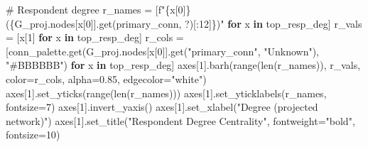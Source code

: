 \documentclass[
  letterpaper,
  DIV=11,
  numbers=noendperiod]{scrartcl}
\newenvironment{Shaded}{\begin{snugshade}}{\end{snugshade}}
\newcommand{\BuiltInTok}[1]{\textcolor[rgb]{0.00,0.23,0.31}{#1}}
\newcommand{\CommentTok}[1]{\textcolor[rgb]{0.37,0.37,0.37}{#1}}
\newcommand{\ControlFlowTok}[1]{\textcolor[rgb]{0.00,0.23,0.31}{\textbf{#1}}}
\newcommand{\DecValTok}[1]{\textcolor[rgb]{0.68,0.00,0.00}{#1}}
\newcommand{\FloatTok}[1]{\textcolor[rgb]{0.68,0.00,0.00}{#1}}
\newcommand{\KeywordTok}[1]{\textcolor[rgb]{0.00,0.23,0.31}{\textbf{#1}}}
\newcommand{\NormalTok}[1]{\textcolor[rgb]{0.00,0.23,0.31}{#1}}
\newcommand{\OperatorTok}[1]{\textcolor[rgb]{0.37,0.37,0.37}{#1}}
\newcommand{\SpecialCharTok}[1]{\textcolor[rgb]{0.37,0.37,0.37}{#1}}
\newcommand{\SpecialStringTok}[1]{\textcolor[rgb]{0.13,0.47,0.30}{#1}}
\newcommand{\StringTok}[1]{\textcolor[rgb]{0.13,0.47,0.30}{#1}}
\begin{document}
\begin{Shaded}
\begin{Highlighting}[]
\CommentTok{\# Respondent degree}
\NormalTok{r\_names }\OperatorTok{=}\NormalTok{ [}\SpecialStringTok{f"}\SpecialCharTok{\{}\NormalTok{x[}\DecValTok{0}\NormalTok{]}\SpecialCharTok{\}}\SpecialStringTok{ (}\SpecialCharTok{\{}\NormalTok{G\_proj}\SpecialCharTok{.}\NormalTok{nodes[x[}\DecValTok{0}\NormalTok{]]}\SpecialCharTok{.}\NormalTok{get(}\StringTok{\textquotesingle{}primary\_conn\textquotesingle{}}\NormalTok{, }\StringTok{\textquotesingle{}?\textquotesingle{}}\NormalTok{)[:}\DecValTok{12}\NormalTok{]}\SpecialCharTok{\}}\SpecialStringTok{)"}
           \ControlFlowTok{for}\NormalTok{ x }\KeywordTok{in}\NormalTok{ top\_resp\_deg]}
\NormalTok{r\_vals }\OperatorTok{=}\NormalTok{ [x[}\DecValTok{1}\NormalTok{] }\ControlFlowTok{for}\NormalTok{ x }\KeywordTok{in}\NormalTok{ top\_resp\_deg]}
\NormalTok{r\_cols }\OperatorTok{=}\NormalTok{ [conn\_palette.get(G\_proj.nodes[x[}\DecValTok{0}\NormalTok{]].get(}\StringTok{"primary\_conn"}\NormalTok{,}
          \StringTok{"Unknown"}\NormalTok{), }\StringTok{"\#BBBBBB"}\NormalTok{) }\ControlFlowTok{for}\NormalTok{ x }\KeywordTok{in}\NormalTok{ top\_resp\_deg]}
\NormalTok{axes[}\DecValTok{1}\NormalTok{].barh(}\BuiltInTok{range}\NormalTok{(}\BuiltInTok{len}\NormalTok{(r\_names)), r\_vals, color}\OperatorTok{=}\NormalTok{r\_cols, alpha}\OperatorTok{=}\FloatTok{0.85}\NormalTok{,}
\NormalTok{             edgecolor}\OperatorTok{=}\StringTok{"white"}\NormalTok{)}
\NormalTok{axes[}\DecValTok{1}\NormalTok{].set\_yticks(}\BuiltInTok{range}\NormalTok{(}\BuiltInTok{len}\NormalTok{(r\_names)))}
\NormalTok{axes[}\DecValTok{1}\NormalTok{].set\_yticklabels(r\_names, fontsize}\OperatorTok{=}\DecValTok{7}\NormalTok{)}
\NormalTok{axes[}\DecValTok{1}\NormalTok{].invert\_yaxis()}
\NormalTok{axes[}\DecValTok{1}\NormalTok{].set\_xlabel(}\StringTok{"Degree (projected network)"}\NormalTok{)}
\NormalTok{axes[}\DecValTok{1}\NormalTok{].set\_title(}\StringTok{"Respondent Degree Centrality"}\NormalTok{,}
\NormalTok{                  fontweight}\OperatorTok{=}\StringTok{"bold"}\NormalTok{, fontsize}\OperatorTok{=}\DecValTok{10}\NormalTok{)}


\end{Highlighting}
\end{Shaded}
\end{document}
